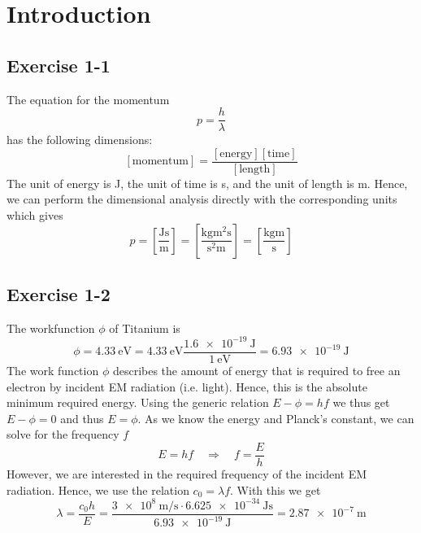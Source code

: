 \chapter{Introduction}

\newpage
\section{Exercise 1-1}
The equation for the momentum
\begin{equation}
	p = \frac{h}{\lambda}
\end{equation}
has the following dimensions:
\[
	\left[\text{momentum}\right] = \frac{\left[\text{energy}\right] \left[\text{time}\right]}{\left[\text{length}\right]}
\]
The unit of energy is \si{\joule}, the unit of time is \si{\second}, and the
unit of length is \si{\meter}. Hence, we can perform the dimensional analysis
directly with the corresponding units which gives
\[
	p
	= \left[ \frac{\si{\joule} \si{\second}}{\si{\meter}} \right]
	= \left[ \frac{\si{\kilogram\meter\squared\second}}{\si{\second\squared\meter}} \right]
	= \left[ \frac{\si{\kilogram\meter}}{\si{\second}} \right]
\]

\newpage
\section{Exercise 1-2}
The workfunction $\phi$ of Titanium is
\[
	\phi
	= \SI{4.33}{\eV}
	= \SI{4.33}{\eV} \frac{\SI{1.6e-19}{\joule}}{\SI{1}{\eV}}
	= \SI{6.93e-19}{\joule}
\]
The work function $\phi$ describes the amount of energy that is required to
free an electron by incident EM radiation (i.e. light). Hence, this is the
absolute minimum required energy. Using the generic relation
$E - \phi = h f$ we thus get $E - \phi = 0$ and thus $E = \phi$. As we know
the energy and Planck's constant, we can solve for the frequency $f$
\[
	E = h f \quad \Rightarrow \quad f = \frac{E}{h}
\]
However, we are interested in the required frequency of the incident EM
radiation. Hence, we use the relation $c_0 = \lambda f$. With this we get
\[
	\lambda
	= \frac{c_0 h}{E}
	= \frac{\SI{3e8}{\meter\per\second} \cdot \SI{6.625e-34}{\joule\second}}{\SI{6.93e-19}{\joule}}
	= \SI{2.87e-7}{\meter}
\]



\newpage
